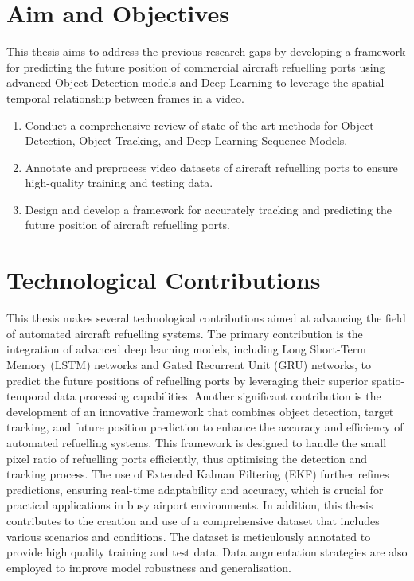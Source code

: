 \documentclass[12pt,oneside]{book} %
\begin{document}
\newpage

\section{Aim and Objectives}
This thesis aims to address the previous research gaps by developing a
framework for predicting the future position of commercial aircraft refuelling
ports using advanced Object Detection models and Deep Learning to leverage the
spatial-temporal relationship between frames in a video.
\begin{enumerate}
    \item Conduct a comprehensive review of state-of-the-art methods for Object
          Detection, Object Tracking, and Deep Learning Sequence Models.
    \item Annotate and preprocess video datasets of aircraft refuelling ports to ensure
          high-quality training and testing data.
    \item Design and develop a framework for accurately tracking and predicting the
          future position of aircraft refuelling ports.
\end{enumerate}

\section{Technological Contributions}
This thesis makes several technological contributions aimed at advancing the
field of automated aircraft refuelling systems. The primary contribution is the
integration of advanced deep learning models, including Long Short-Term Memory
(LSTM) networks and Gated Recurrent Unit (GRU) networks, to predict the future
positions of refuelling ports by leveraging their superior spatio-temporal data
processing capabilities. Another significant contribution is the development of
an innovative framework that combines object detection, target tracking, and
future position prediction to enhance the accuracy and efficiency of automated
refuelling systems. This framework is designed to handle the small pixel ratio
of refuelling ports efficiently, thus optimising the detection and tracking
process. The use of Extended Kalman Filtering (EKF) further refines
predictions, ensuring real-time adaptability and accuracy, which is crucial for
practical applications in busy airport environments. In addition, this thesis
contributes to the creation and use of a comprehensive dataset that includes
various scenarios and conditions. The dataset is meticulously annotated to
provide high quality training and test data. Data augmentation strategies are
also employed to improve model robustness and generalisation.
\end{document}
